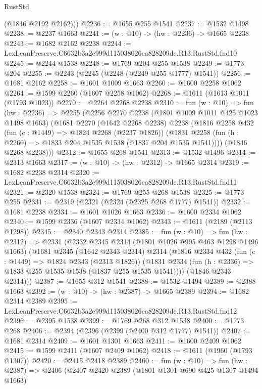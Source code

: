 \begin{lexlean}{RustStd}
\begin{coremodule}
        (@1846 @2192 @2162)))
@2236 := @1655 @255 @1541
@2237 := @1532 @1498
@2238 := @2237 @1663
@2241 := (w : @10) -> (hw : @2236) -> @1665 @2238
@2243 := @1682 @2162 @2238
@2244 := LexLeanPreserve.C6632b3a2e999d115038026ca828209de.R13.RustStd.fnd10
@2245 := @2244 @1538
@2248 := @1769 @204 @255 @1538
@2249 := @1773 @204
@2255 := @2243 (@2245 (@2248 (@2249 @255 @1777) @1541))
@2256 := @1681 @2162
@2258 := @1601 @1009 @1663
@2260 := @1600 @2258 @1062
@2264 := @1599 @2260 (@1607 @2258 @1062)
@2268 := @1611 (@1613 @1011 (@1793 @1023))
@2270 := @2264 @2268 @2238
@2310 := fun (w : @10) =>
  fun (hw : @2236) =>
  @2255
    (@2256
      @2270
      @2238
      (@1801 @1009 @1011 @425 @1023 @1498 @1663)
      (@1681
        @2270
        (@1642 @2268 @2238)
        @2238
        (@1816
          @2258
          @432
          (fun (c : @1449) => @1824 @2268 (@2237 @1826))
          (@1831 @2258 (fun (h : @2260) => @1833 @204 @1535 @1538 (@1837 @204 @1535 @1541))))
        (@1846 @2268 @2238)))
@2312 := @1655 @268 @1541
@2313 := @1532 @1496
@2314 := @2313 @1663
@2317 := (w : @10) -> (hw : @2312) -> @1665 @2314
@2319 := @1682 @2238 @2314
@2320 := LexLeanPreserve.C6632b3a2e999d115038026ca828209de.R13.RustStd.fnd11
@2321 := @2320 @1538
@2324 := @1769 @255 @268 @1538
@2325 := @1773 @255
@2331 := @2319 (@2321 (@2324 (@2325 @268 @1777) @1541))
@2332 := @1681 @2238
@2334 := @1601 @1026 @1663
@2336 := @1600 @2334 @1062
@2340 := @1599 @2336 (@1607 @2334 @1062)
@2343 := @1611 (@2189 (@2113 @1298))
@2345 := @2340 @2343 @2314
@2385 := fun (w : @10) =>
  fun (hw : @2312) =>
  @2331
    (@2332
      @2345
      @2314
      (@1801 @1026 @995 @463 @1298 @1496 @1663)
      (@1681
        @2345
        (@1642 @2343 @2314)
        @2314
        (@1816
          @2334
          @432
          (fun (c : @1449) => @1824 @2343 (@2313 @1826))
          (@1831 @2334 (fun (h : @2336) => @1833 @255 @1535 @1538 (@1837 @255 @1535 @1541))))
        (@1846 @2343 @2314)))
@2387 := @1655 @312 @1541
@2388 := @1532 @1494
@2389 := @2388 @1663
@2392 := (w : @10) -> (hw : @2387) -> @1665 @2389
@2394 := @1682 @2314 @2389
@2395 := LexLeanPreserve.C6632b3a2e999d115038026ca828209de.R13.RustStd.fnd12
@2396 := @2395 @1538
@2399 := @1769 @268 @312 @1538
@2400 := @1773 @268
@2406 := @2394 (@2396 (@2399 (@2400 @312 @1777) @1541))
@2407 := @1681 @2314
@2409 := @1601 @1301 @1663
@2411 := @1600 @2409 @1062
@2415 := @1599 @2411 (@1607 @2409 @1062)
@2418 := @1611 (@1960 (@1793 @1307))
@2420 := @2415 @2418 @2389
@2460 := fun (w : @10) =>
  fun (hw : @2387) =>
  @2406
    (@2407
      @2420
      @2389
      (@1801 @1301 @690 @425 @1307 @1494 @1663)

\end{coremodule}
\end{lexlean}
